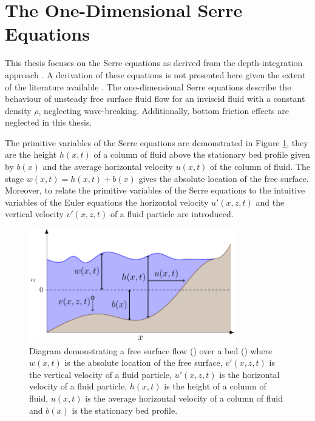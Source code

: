 \section{The One-Dimensional Serre Equations}
This thesis focuses on the Serre equations as derived from the depth-integration approach \cite{Su-Gardener-1969-536,Seabra-Santos-etal-1987-117}. A derivation of these equations is not presented here given the extent of the literature available \cite{Su-Gardener-1969-536,Seabra-Santos-etal-1987-117,Zoppou-2014}. The one-dimensional Serre equations describe the behaviour of unsteady free surface fluid flow for an inviscid fluid with a constant density $\rho$, neglecting wave-breaking. Additionally, bottom friction effects are neglected in this thesis. 

The primitive variables of the Serre equations are demonstrated in Figure \ref{fig:WaterModel}, they are the height $h(x,t)$ of a column of fluid above the stationary bed profile given by $b(x)$ and the average horizontal velocity $u(x,t)$ of the column of fluid. The stage $w(x,t) = h(x,t) + b(x)$ gives the absolute location of the free surface. Moreover, to relate the primitive variables of the Serre equations to the intuitive variables of the Euler equations the horizontal velocity $u'(x,z,t)$ and the vertical velocity $v'(x,z,t)$ of a fluid particle are introduced.

\begin{figure}
	\centering
	\includegraphics[width=0.8\textwidth]{./chp2/figures/SerreModel.pdf}
	\caption{Diagram demonstrating a free surface flow () over a bed () where $w(x,t)$ is the absolute location of the free surface, $v'(x,z,t)$ is the vertical velocity of a fluid particle, $u'(x,z,t)$ is the horizontal velocity of a fluid particle, $h(x,t)$ is the height of a column of fluid, $u(x,t)$ is the average horizontal velocity of a column of fluid and $b(x)$ is the stationary bed profile.}
	\label{fig:WaterModel}
\end{figure}

